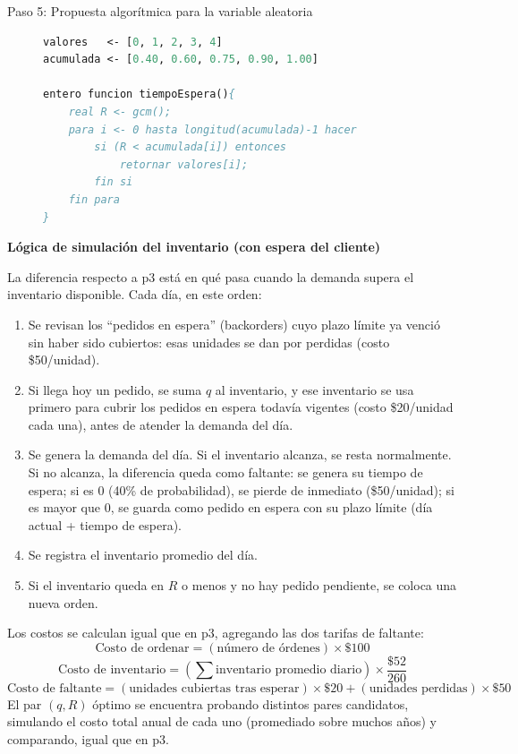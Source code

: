 \begin{description}
    \item[Paso 5: Propuesta algorítmica para la variable aleatoria]

    \begin{lstlisting}[caption={tiempoEspera()}, language=Pascal]
valores   <- [0, 1, 2, 3, 4]
acumulada <- [0.40, 0.60, 0.75, 0.90, 1.00]

entero funcion tiempoEspera(){
    real R <- gcm();
    para i <- 0 hasta longitud(acumulada)-1 hacer
        si (R < acumulada[i]) entonces
            retornar valores[i];
        fin si
    fin para
}
    \end{lstlisting}
\end{description}

\textbf{Lógica de simulación del inventario (con espera del cliente)}

La diferencia respecto a p3 está en qué pasa cuando la demanda supera el inventario disponible. Cada día, en este orden:
\begin{enumerate}
    \item Se revisan los ``pedidos en espera'' (backorders) cuyo plazo límite ya venció sin haber sido cubiertos: esas unidades se dan por perdidas (costo \$50/unidad).
    \item Si llega hoy un pedido, se suma $q$ al inventario, y ese inventario se usa primero para cubrir los pedidos en espera todavía vigentes (costo \$20/unidad cada una), antes de atender la demanda del día.
    \item Se genera la demanda del día. Si el inventario alcanza, se resta normalmente. Si no alcanza, la diferencia queda como faltante: se genera su tiempo de espera; si es 0 (40\% de probabilidad), se pierde de inmediato (\$50/unidad); si es mayor que 0, se guarda como pedido en espera con su plazo límite (día actual + tiempo de espera).
    \item Se registra el inventario promedio del día.
    \item Si el inventario queda en $R$ o menos y no hay pedido pendiente, se coloca una nueva orden.
\end{enumerate}

Los costos se calculan igual que en p3, agregando las dos tarifas de faltante:
\[
\text{Costo de ordenar} = (\text{n\'umero de \'ordenes}) \times \$100
\]
\[
\text{Costo de inventario} = \left(\sum \text{inventario promedio diario}\right) \times \frac{\$52}{260}
\]
\[
\text{Costo de faltante} = (\text{unidades cubiertas tras esperar}) \times \$20 + (\text{unidades perdidas}) \times \$50
\]
El par $(q,R)$ óptimo se encuentra probando distintos pares candidatos, simulando el costo total anual de cada uno (promediado sobre muchos años) y comparando, igual que en p3.


